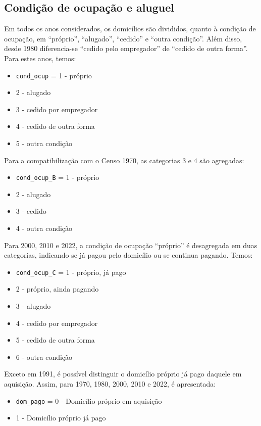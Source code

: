 \documentclass[12pt,a4paper]{article}
\newcommand{\vr}[1]{\texttt{#1}}
\begin{document}
\subsection{Condição de ocupação e aluguel}\label{sec:c6}
Em todos os anos considerados, os domicílios são divididos, quanto à condição de ocupação, em “próprio”, “alugado”, “cedido” e “outra condição”. Além disso, desde 1980 diferencia-se “cedido pelo empregador” de “cedido de outra forma”. Para estes anos, temos:
\begin{itemize}
  \item \vr{cond\_ocup} = 1 - próprio
  \item 2 - alugado
  \item 3 - cedido por empregador
  \item 4 - cedido de outra forma
  \item 5 - outra condição
\end{itemize}

Para a compatibilização com o Censo 1970, as categorias 3 e 4 são agregadas:
\begin{itemize}
  \item \vr{cond\_ocup\_B} = 1 - próprio
  \item 2 - alugado
  \item 3 - cedido
  \item 4 - outra condição
\end{itemize}

Para 2000, 2010 e 2022, a condição de ocupação “próprio” é desagregada em duas categorias, indicando se já pagou pelo domicílio ou se continua pagando. Temos:
\begin{itemize}
  \item \vr{cond\_ocup\_C} = 1 - próprio, já pago
  \item 2 - próprio, ainda pagando
  \item 3 - alugado
  \item 4 - cedido por empregador
  \item 5 - cedido de outra forma
  \item 6 - outra condição
\end{itemize}

Exceto em 1991, é possível distinguir o domicílio próprio já pago daquele em aquisição. Assim, para 1970, 1980, 2000, 2010 e 2022, é apresentada:
\begin{itemize}
  \item \vr{dom\_pago} = 0 - Domicílio próprio em aquisição
  \item 1 - Domicílio próprio já pago
\end{itemize}
\end{document}

